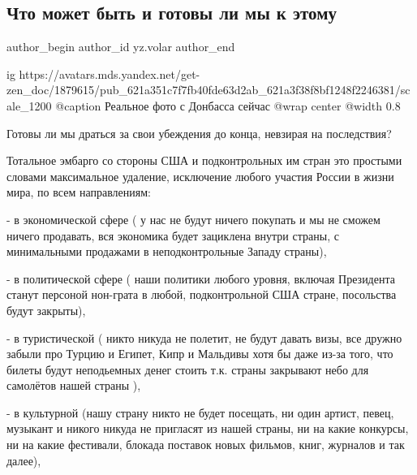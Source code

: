  
 
 
 
 
 
\subsection{Что может быть и готовы ли мы к этому}
\label{sec:26_02_2022.yz.volar.1.chto_mozhet_byt}
 
\ifcmt
 author_begin
   author_id yz.volar
 author_end
\fi

\ifcmt
  ig https://avatars.mds.yandex.net/get-zen_doc/1879615/pub_621a351c7f7fb40fde63d2ab_621a3f38f8bf1248f2246381/scale_1200
  @caption Реальное фото с Донбасса сейчас
  @wrap center
  @width 0.8
\fi

Готовы ли мы драться за свои убеждения до конца, невзирая на последствия?

Тотальное эмбарго со стороны США и подконтрольных им стран это простыми словами
максимальное удаление, исключение любого участия России в жизни мира, по всем
направлениям:

- в экономической сфере ( у нас не будут ничего покупать и мы не сможем ничего
продавать, вся экономика будет зациклена внутри страны, с минимальными
продажами в неподконтрольные Западу страны),

- в политической сфере ( наши политики любого уровня, включая Президента станут
персоной нон-грата в любой, подконтрольной США стране, посольства будут
закрыты),

- в туристической ( никто никуда не полетит, не будут давать визы, все дружно
забыли про Турцию и Египет, Кипр и Мальдивы хотя бы даже из-за того, что билеты
будут неподьемных денег стоить т.к. страны закрывают небо для самолётов нашей
страны ),

- в культурной (нашу страну никто не будет посещать, ни один артист, певец,
музыкант и никого никуда не пригласят из нашей страны, ни на какие конкурсы, ни
на какие фестивали, блокада поставок новых фильмов, книг, журналов и так
далее),

